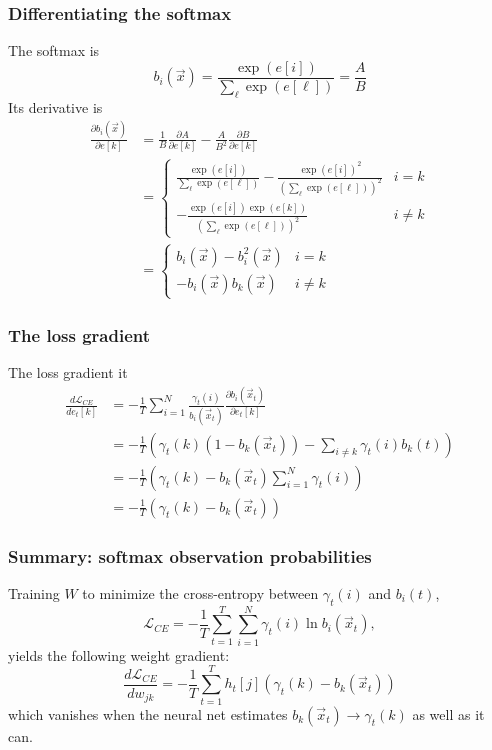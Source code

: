 \documentclass{beamer}
\begin{document}
\begin{frame}
  \frametitle{Differentiating the softmax}

  The softmax is
  \begin{displaymath}
    b_i(\vec{x}) =\frac{\exp(e[i])}{\sum_\ell \exp(e[\ell])}=\frac{A}{B}
  \end{displaymath}
  Its  derivative is
  \begin{align*}
    \frac{\partial b_i(\vec{x})}{\partial e[k]}
    &= \frac{1}{B}\frac{\partial A}{\partial e[k]}-\frac{A}{B^2}\frac{\partial B}{\partial e[k]}\\
    &=\begin{cases}
    \frac{\exp(e[i])}{\sum_\ell\exp(e[\ell])}-
    \frac{\exp(e[i])^2}{\left(\sum_\ell\exp(e[\ell])\right)^2} & i=k\\
    -\frac{\exp(e[i])\exp(e[k])}{\left(\sum_\ell\exp(e[\ell])\right)^2} & i\ne k
    \end{cases}\\
    &=\begin{cases}
    b_i(\vec{x})-b_i^2(\vec{x}) & i=k\\
    -b_i(\vec{x})b_k(\vec{x}) &  i\ne k
    \end{cases}
  \end{align*}
\end{frame}

\begin{frame}
  \frametitle{The loss gradient}

  The loss gradient it
  \begin{align*}
    \frac{d{\mathcal L}_{CE}}{de_t[k]}
    &= -\frac{1}{T}\sum_{i=1}^N\frac{\gamma_t(i)}{b_i(\vec{x}_t)}\frac{\partial b_i(\vec{x}_t)}{\partial e_t[k]}\\
    &= -\frac{1}{T}\left(\gamma_t(k)(1-b_k(\vec{x}_t))-\sum_{i\ne k}\gamma_t(i)b_k(t)\right)\\
    &= -\frac{1}{T}\left(\gamma_t(k)-b_k(\vec{x}_t)\sum_{i=1}^N\gamma_t(i)\right)\\
    &= -\frac{1}{T}\left(\gamma_t(k)-b_k(\vec{x}_t)\right)
  \end{align*}
\end{frame}

\begin{frame}
  \frametitle{Summary: softmax observation probabilities}

  Training $W$ to minimize the cross-entropy  between $\gamma_t(i)$ and $b_i(t)$,
  \begin{displaymath}
    {\mathcal L}_{CE} = -\frac{1}{T}\sum_{t=1}^T\sum_{i=1}^N\gamma_t(i)\ln b_i(\vec{x}_t),
  \end{displaymath}
  yields the following weight gradient:
  \begin{displaymath}
    \frac{d{\mathcal L}_{CE}}{dw_{jk}}=
    -\frac{1}{T}\sum_{t=1}^T h_{t}[j]\left(\gamma_t(k)-b_k(\vec{x}_t)\right)
  \end{displaymath}
  which vanishes when the neural net estimates
  $b_k(\vec{x}_t)\rightarrow \gamma_t(k)$ as well as it can.
\end{frame}
\end{document}
